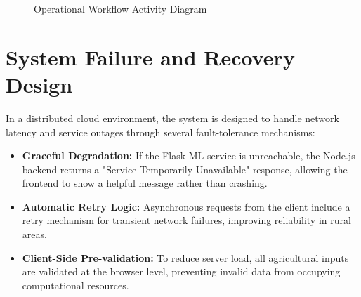 \documentclass[12pt,a4paper]{report}
\begin{document}
\begin{figure}[H]
    \centering
    \caption{Operational Workflow Activity Diagram}
\end{figure}

\section{System Failure and Recovery Design}
\label{sec:4.11}
In a distributed cloud environment, the system is designed to handle network latency and service outages through several fault-tolerance mechanisms:
\begin{itemize}
    \item \textbf{Graceful Degradation:} If the Flask ML service is unreachable, the Node.js backend returns a "Service Temporarily Unavailable" response, allowing the frontend to show a helpful message rather than crashing.
    \item \textbf{Automatic Retry Logic:} Asynchronous requests from the client include a retry mechanism for transient network failures, improving reliability in rural areas.
    \item \textbf{Client-Side Pre-validation:} To reduce server load, all agricultural inputs are validated at the browser level, preventing invalid data from occupying computational resources.
\end{itemize}
\end{document}
